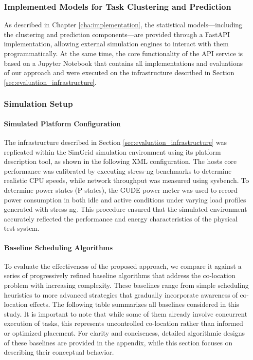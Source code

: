\subsubsection{Implemented Models for Task Clustering and Prediction}
\label{sec:evaluation_statistical_learning_methods}
As described in Chapter \ref{cha:implementation}, the statistical models—including the clustering and prediction components—are provided through a FastAPI implementation, allowing external simulation engines to interact with them programmatically. At the same time, the core functionality of the API service is based on a Jupyter Notebook that contains all implementations and evaluations of our approach and were executed on the infrastructure described in Section \ref{sec:evaluation_infrastructure}.

\subsubsection{Simulation Setup}
\label{sec:evaluation_simulation}

\paragraph{Simulated Platform Configuration}
The infrastructure described in Section \ref{sec:evaluation_infrastructure} was replicated within the SimGrid simulation environment using its platform description tool, as shown in the following XML configuration. The hosts core performance was calibrated by executing stress-ng benchmarks to determine realistic CPU speeds, while network throughput was measured using sysbench. To determine power states (P-states), the GUDE power meter was used to record power consumption in both idle and active conditions under varying load profiles generated with stress-ng. This procedure ensured that the simulated environment accurately reflected the performance and energy characteristics of the physical test system.



\paragraph{Baseline Scheduling Algorithms}

To evaluate the effectiveness of the proposed approach, we compare it against a series of progressively refined baseline algorithms that address the co-location problem with increasing complexity. These baselines range from simple scheduling heuristics to more advanced strategies that gradually incorporate awareness of co-location effects. The following table summarizes all baselines considered in this study. It is important to note that while some of them already involve concurrent execution of tasks, this represents uncontrolled co-location rather than informed or optimized placement. For clarity and conciseness, detailed algorithmic designs of these baselines are provided in the appendix, while this section focuses on describing their conceptual behavior.

